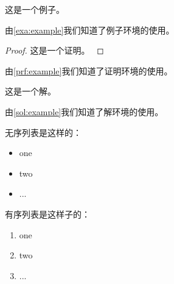 \documentclass[withoutpreface,bwprint]{cumcmthesis} %
\begin{document}
\begin{appendices}
\begin{example}
	这是一个例子。
	\label{exa:example}
\end{example}
由\cref{exa:example}我们知道了例子环境的使用。







\begin{proof}
	这是一个证明。
	\label{prf:example}
\end{proof}
由\cref{prf:example}我们知道了证明环境的使用。





\begin{solution}
	这是一个解。
	\label{sol:example}
\end{solution}
由\cref{sol:example}我们知道了解环境的使用。




无序列表是这样的：
\begin{itemize}
	\item one
	\item two
	\item ...
\end{itemize}

有序列表是这样子的：
\begin{enumerate}
	\item one
	\item two
	\item ...
\end{enumerate}










\end{appendices}
\end{document}
